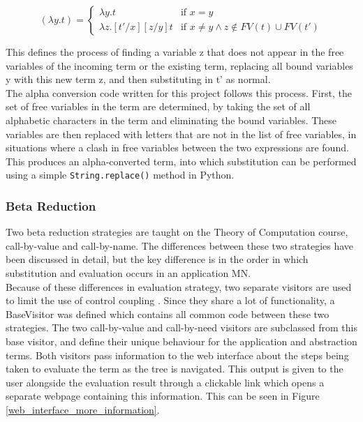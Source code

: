 \documentclass[a4paper,11pt]{report}
\begin{document}
\begin{equation*}
[t'/x](\lambda y.t)=\begin{cases}
\lambda y.t & \text{if $x=y$}\\
\lambda z.[t'/x][z/y]t & \text{if $x\ne y \land z\notin FV(t) \cup FV(t')$}
\end{cases}
\end{equation*}

This defines the process of finding a variable z that does not appear in the free variables of the incoming term or the existing term, replacing all bound variables y with this new term z, and then substituting in t’ as normal.\\

The alpha conversion code written for this project follows this process. First, the set of free variables in the term are determined, by taking the set of all alphabetic characters in the term and eliminating the bound variables. These variables are then replaced with letters that are not in the list of free variables, in situations where a clash in free variables between the two expressions are found. This produces an alpha-converted term, into which substitution can be performed using a simple \texttt{String.replace()} method in Python.

\subsubsection{Beta Reduction}

Two beta reduction strategies are taught on the Theory of Computation course, call-by-value and call-by-name. The differences between these two strategies have been discussed in detail, but the key difference is in the order in which substitution and evaluation occurs in an application MN.\\

Because of these differences in evaluation strategy, two separate visitors are used to limit the use of control coupling \cite{Lethbridge2004}. Since they share a lot of functionality, a BaseVisitor was defined which contains all common code between these two strategies. The two call-by-value and call-by-need visitors are subclassed from this base visitor, and define their unique behaviour for the application and abstraction terms. Both visitors pass information to the web interface about the steps being taken to evaluate the term as the tree is navigated. This output is given to the user alongside the evaluation result through a clickable link which opens a separate webpage containing this information. This can be seen in Figure \ref{web_interface_more_information}.\\
\end{document}
